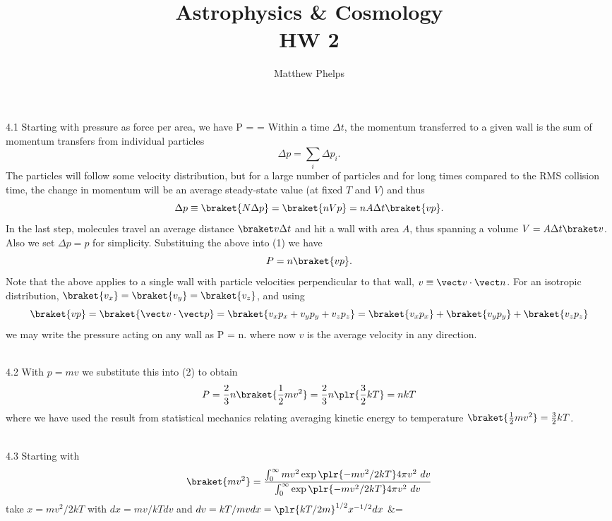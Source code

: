 \documentclass[10pt,letterpaper]{article}
\title{Astrophysics \& Cosmology\\HW 2}
\author{Matthew Phelps}
\date{}
\begin{document}
\maketitle

\benum

\item[4.1]
Starting with pressure as force per area, we have
\be
	P =  =   
\ee
Within a time $\Delta t$, the momentum transferred to a given wall is the sum of momentum transfers from individual particles
\[
	\Delta p = \sum_i \Delta p_i.
\]
The particles will follow some velocity distribution, but for a large number of particles and for long times compared to the RMS collision time, the change in momentum will be an average steady-state value (at fixed $T$ and $V$) and thus
\[
	\Delta p \equiv \braket{N\Delta p} = \braket{nV p} = n A\Delta t\braket{vp}.
\]
In the last step, molecules travel an average distance $\braket v \Delta t$ and hit a wall with area $A$, thus spanning a volume $V = A\Delta t \braket v$. Also we set $\Delta p = p$ for simplicity. Substituing the above into (1) we have
\[
	P = n\braket{vp}.
\]
Note that the above applies to a single wall with particle velocities perpendicular to that wall, $v \equiv \vect v\cdot \vect n$. 
For an isotropic distribution, $\braket{v_x} = \braket{v_y}= \braket{v_z}$, and using 
\[
	\braket{vp} =\braket{ \vect v \cdot \vect p} = \braket{v_x p_x + v_y p_y + v_z p_z}= \braket{v_xp_x}+\braket{v_y p_y} + \braket{v_z p_z}
\]
we may write the pressure acting on any wall as 
\be
	P =  n.
\ee
where now $v$ is the average velocity in any direction. \\ \\
\item[4.2]
With $p=mv$ we substitute this into (2) to obtain
\[
	P = \frac23 n\braket{\frac12 mv^2} = \frac23n \plr{\frac32 kT} =  nkT
\]
where we have used the result from statistical mechanics relating averaging kinetic energy to temperature $\braket{\frac12 mv^2} = \frac32 kT$. \\ \\
\item[4.3]
Starting with
\[
	\braket{mv^2} = \frac{ \int_0^\infty mv^2 \exp\plr{-mv^2/2kT}4\pi v^2\ dv}{\int_0^\infty \exp\plr{-mv^2/2kT}4\pi v^2\ dv}
\]
take $x = mv^2/2kT$ with $dx = mv/kT dv$ and $dv = kT/mv dx = \plr{kT/2m}^{1/2} x^{-1/2} dx$
\ba
	 &= \\
\end{document}
